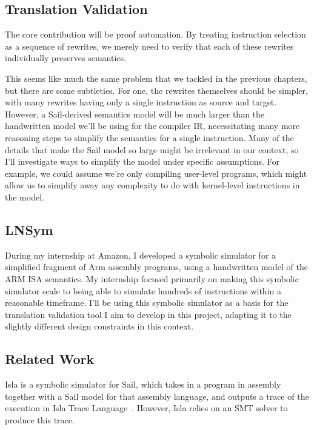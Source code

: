 \documentclass[a4paper]{scrartcl}
\begin{document}
\subsection{Translation Validation}\label{translation-validation}

The core contribution will be proof automation. By treating
instruction selection as a sequence of rewrites, we merely need to
verify that each of these rewrites individually preserves semantics.

This seems like much the same problem that we tackled in the previous
chapters, but there are some subtleties. For one, the rewrites
themselves should be simpler, with many rewrites having only a single
instruction as source and target. However, a Sail-derived semantics
model will be much larger than the handwritten model we'll be using for
the compiler IR, necessitating many more reasoning steps to simplify the
semantics for a single instruction. Many of the details that make the
Sail model so large might be irrelevant in our context, so I'll
investigate ways to simplify the model under specific assumptions. For
example, we could assume we're only compiling user-level programs, which might
allow us to simplify away any complexity to do with kernel-level
instructions in the model.

\subsection{LNSym}\label{lnsym}

During my internship at Amazon, I developed a symbolic simulator for a
simplified fragment of Arm assembly programs, using a handwritten model
of the ARM ISA semantics. My internship focused primarily on making this
symbolic simulator scale to being able to simulate hundreds of
instructions within a reasonable timeframe. I'll be using this symbolic
simulator as a basis for the translation validation tool I aim to
develop in this project, adapting it to the slightly different design constraints in
this context. 

\subsection{Related Work}\label{related-work}

Isla is a symbolic simulator for Sail, which takes in a program in assembly 
together with a Sail model for that assembly language, and outputs a trace of the
execution in Isla Trace Language~\cite{armstrongIslaIntegratingFullScale2021}.
However, Isla relies on an SMT solver to produce this trace.
\end{document}
